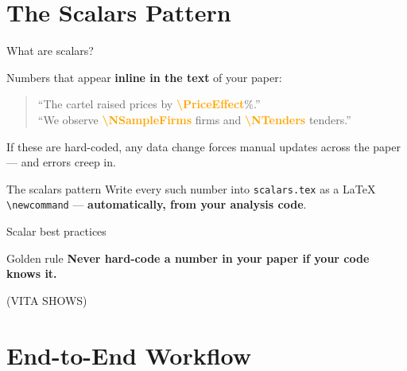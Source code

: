 \documentclass{beamer}
\newcommand{\code}[1]{\texttt{\small#1}}
\begin{document}
\section{The Scalars Pattern}

\begin{frame}{What are scalars?}

Numbers that appear \textbf{inline in the text} of your paper:

\medskip
\begin{quote}
  ``The cartel raised prices by \textbf{\textcolor{orange}{\textbackslash PriceEffect}}\%.''\\[4pt]
  ``We observe \textbf{\textcolor{orange}{\textbackslash NSampleFirms}} firms
    and \textbf{\textcolor{orange}{\textbackslash NTenders}} tenders.''
\end{quote}

\medskip
If these are hard-coded, any data change forces manual updates
across the paper — and errors creep in.

\bigskip
\begin{block}{The scalars pattern}
Write every such number into \code{scalars.tex} as a \LaTeX{}
\texttt{\textbackslash newcommand} — \textbf{automatically, from
your analysis code}.
\end{block}

\end{frame}

\begin{frame}{Scalar best practices}

\begin{block}{Golden rule}
  \textbf{Never hard-code a number in your paper if your code knows it.}
  


\end{block}
 \bigskip
 
 (VITA SHOWS)

\end{frame}

\section{End-to-End Workflow}
\end{document}
